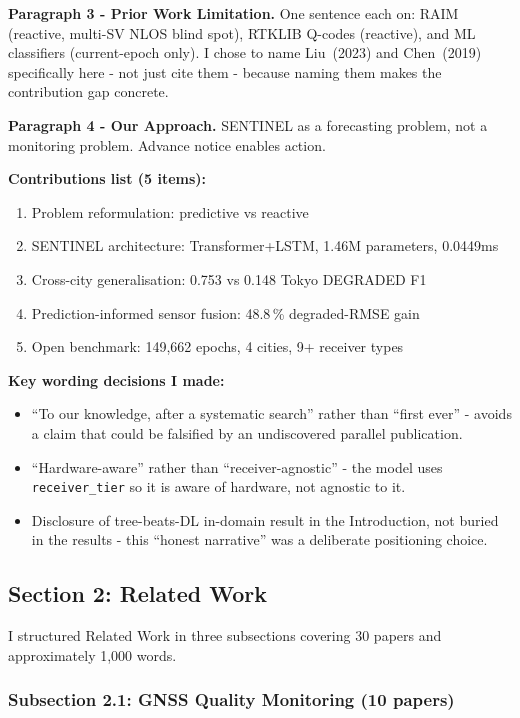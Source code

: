 \documentclass[12pt,a4paper]{article}
\newcommand{\code}[1]{\texttt{#1}}
\begin{document}
\textbf{Paragraph 3 - Prior Work Limitation.}
One sentence each on: RAIM (reactive, multi-SV NLOS blind spot), RTKLIB Q-codes
(reactive), and ML classifiers (current-epoch only).
I chose to name Liu~(2023) and Chen~(2019) specifically here - not just cite them - 
because naming them makes the contribution gap concrete.

\textbf{Paragraph 4 - Our Approach.}
SENTINEL as a forecasting problem, not a monitoring problem.
Advance notice enables action.

\textbf{Contributions list (5 items):}
\begin{enumerate}
  \item Problem reformulation: predictive vs reactive
  \item SENTINEL architecture: Transformer+LSTM, 1.46M parameters, 0.0449ms
  \item Cross-city generalisation: 0.753 vs 0.148 Tokyo DEGRADED F1
  \item Prediction-informed sensor fusion: 48.8\,\% degraded-RMSE gain
  \item Open benchmark: 149,662 epochs, 4 cities, 9+ receiver types
\end{enumerate}

\textbf{Key wording decisions I made:}
\begin{itemize}
  \item ``To our knowledge, after a systematic search'' rather than ``first ever'' - 
    avoids a claim that could be falsified by an undiscovered parallel publication.
  \item ``Hardware-aware'' rather than ``receiver-agnostic'' - the model uses
    \code{receiver\_tier} so it is aware of hardware, not agnostic to it.
  \item Disclosure of tree-beats-DL in-domain result in the Introduction, not buried
    in the results - this ``honest narrative'' was a deliberate positioning choice.
\end{itemize}

\subsection{Section 2: Related Work}

I structured Related Work in three subsections covering 30 papers and approximately
1,000 words.

\subsubsection{Subsection 2.1: GNSS Quality Monitoring (10 papers)}
\end{document}
